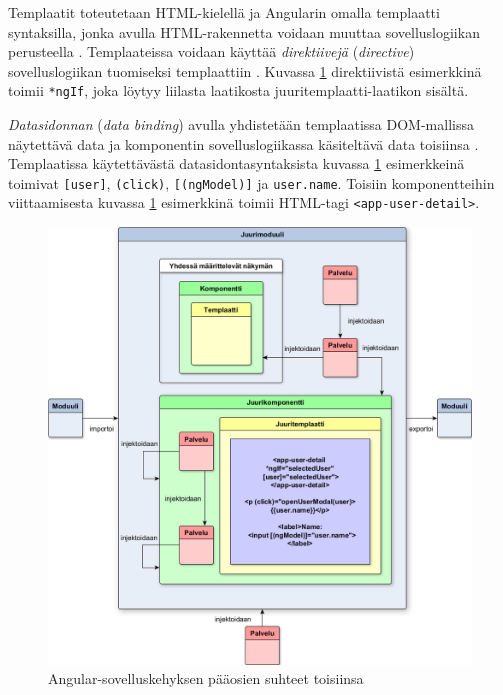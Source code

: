 \documentclass[finnish]{tktltiki2}
\theoremstyle{definition}
\theoremstyle{remark}
\numberwithin{figure}{section}
\begin{document}
Templaatit toteutetaan HTML-kielellä ja Angularin omalla templaatti syntaksilla, jonka avulla HTML-rakennetta voidaan muuttaa sovelluslogiikan perusteella \cite{ArchitectureComponents}. Templaateissa voidaan käyttää \textit{direktiivejä} (\textit{directive}) sovelluslogiikan tuomiseksi templaattiin \cite{TemplateSyntax}. Kuvassa \ref{fig:AngularAppArchitectureOverview} direktiivistä esimerkkinä toimii \texttt{*ngIf}, joka löytyy liilasta laatikosta juuritemplaatti-laatikon sisältä. 

\textit{Datasidonnan} (\textit{data binding}) avulla yhdistetään templaatissa DOM-mallissa näytettävä data ja komponentin sovelluslogiikassa käsiteltävä data toisiinsa \cite{ArchitectureComponents}. Templaatissa käytettävästä datasidontasyntaksista kuvassa \ref{fig:AngularAppArchitectureOverview} esimerkkeinä toimivat \texttt{[user]}, \texttt{(click)}, \texttt{[(ngModel)]} ja \texttt{{{user.name}}}. Toisiin komponentteihin viittaamisesta kuvassa \ref{fig:AngularAppArchitectureOverview} esimerkkinä toimii HTML-tagi \texttt{<app-user-detail>}.

\begin{figure}[H]
  \centering
  \includegraphics[width=14cm]{images/AngularAppArchitectureOverview.png}
  \caption{Angular-sovelluskehyksen pääosien suhteet toisiinsa}
  \label{fig:AngularAppArchitectureOverview}
\end{figure}
\end{document}
